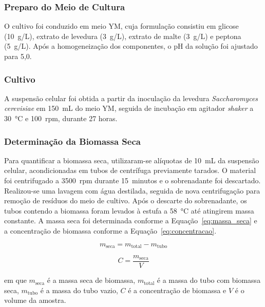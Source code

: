 \subsubsection{Preparo do Meio de Cultura}

O cultivo foi conduzido em meio YM, cuja formulação consistiu em glicose (10~g/L), extrato de levedura (3~g/L), extrato de malte (3~g/L) e peptona (5~g/L). Após a homogeneização dos componentes, o pH da solução foi ajustado para 5,0.

\subsubsection{Cultivo}

A suspensão celular foi obtida a partir da inoculação da levedura \textit{Saccharomyces cerevisiae} em 150~mL do meio YM, seguida de incubação em agitador \textit{shaker} a 30~°C e 100~rpm, durante 27 horas.

\subsubsection{Determinação da Biomassa Seca}

Para quantificar a biomassa seca, utilizaram-se alíquotas de 10~mL da suspensão celular, acondicionadas em tubos de centrífuga previamente tarados. O material foi centrifugado a 3500~rpm durante 15~minutos e o sobrenadante foi descartado. Realizou-se uma lavagem com água destilada, seguida de nova centrifugação para remoção de resíduos do meio de cultivo. Após o descarte do sobrenadante, os tubos contendo a biomassa foram levados à estufa a 58~°C até atingirem massa constante. A massa seca foi determinada conforme a Equação~\ref{eq:massa_seca} e a concentração de biomassa conforme a Equação~\ref{eq:concentracao}.

\begin{equation}
    m_{\text{seca}} = m_{\text{total}} - m_{\text{tubo}}
    \label{eq:massa_seca}
\end{equation}

\begin{equation}
    C = \frac{m_{\text{seca}}}{V}
    \label{eq:concentracao}
\end{equation}

em que $m_{\text{seca}}$ é a massa seca de biomassa, $m_{\text{total}}$ é a massa do tubo com biomassa seca, $m_{\text{tubo}}$ é a massa do tubo vazio, $C$ é a concentração de biomassa e $V$ é o volume da amostra.

